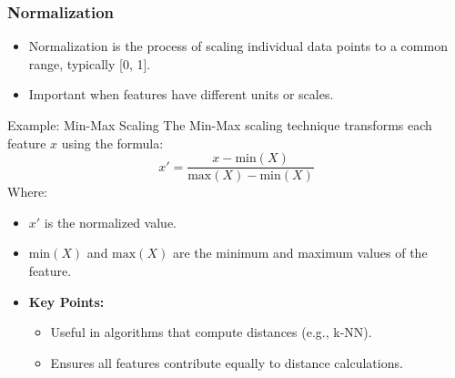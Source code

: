 \documentclass[aspectratio=169]{beamer}
\begin{document}
\begin{frame}[fragile]
    \frametitle{Normalization}
    \begin{itemize}
        \item Normalization is the process of scaling individual data points to a common range, typically [0, 1].
        \item Important when features have different units or scales.
    \end{itemize}
    
    \begin{block}{Example: Min-Max Scaling}
        The Min-Max scaling technique transforms each feature \( x \) using the formula:
        \begin{equation}
            x' = \frac{x - \text{min}(X)}{\text{max}(X) - \text{min}(X)}
        \end{equation}
        Where:
        \begin{itemize}
            \item \( x' \) is the normalized value.
            \item \( \text{min}(X) \) and \( \text{max}(X) \) are the minimum and maximum values of the feature.
        \end{itemize}
    \end{block}
    
    \begin{itemize}
        \item \textbf{Key Points:}
        \begin{itemize}
            \item Useful in algorithms that compute distances (e.g., k-NN).
            \item Ensures all features contribute equally to distance calculations.
        \end{itemize}
    \end{itemize}
\end{frame}
\end{document}
